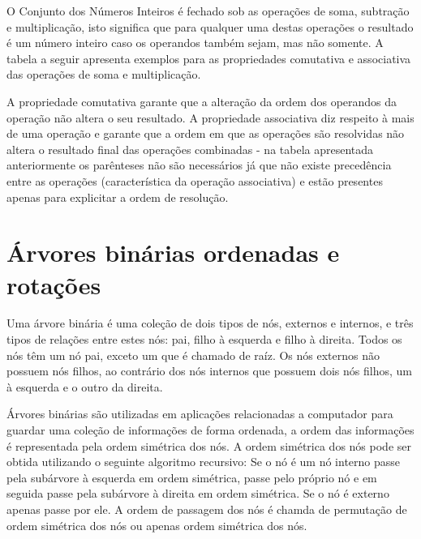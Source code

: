 O Conjunto dos Números Inteiros é fechado sob as operações de soma, subtração e multiplicação, isto significa que para qualquer uma destas operações o resultado é um número inteiro caso os operandos também sejam, mas não somente. A tabela a seguir apresenta exemplos para as propriedades comutativa e associativa das operações de soma e multiplicação.

\begin{table}[htb]
\end{table}

A propriedade comutativa garante que a alteração da ordem dos operandos da operação não altera o seu resultado. A propriedade associativa diz respeito à mais de uma operação e garante que a ordem em que as operações são resolvidas não altera o resultado final das operações combinadas - na tabela apresentada anteriormente os parênteses não são necessários já que não existe precedência entre as operações (característica da operação associativa) e estão presentes apenas para explicitar a ordem de resolução.

\chapter{Árvores binárias ordenadas e rotações}
Uma árvore binária é uma coleção de dois tipos de nós, externos e internos, e três tipos de relações entre estes nós: pai, filho à esquerda e filho à direita. Todos os nós têm um nó pai, exceto um que é chamado de raíz. Os nós externos não possuem nós filhos, ao contrário dos nós internos que possuem dois nós filhos, um à esquerda e o outro da direita.

Árvores binárias são utilizadas em aplicações relacionadas a computador para guardar uma coleção de informações de forma ordenada, a ordem das informações é representada pela ordem simétrica dos nós. A ordem simétrica dos nós pode ser obtida utilizando o seguinte algoritmo recursivo: Se o nó é um nó interno passe pela subárvore à esquerda em ordem simétrica, passe pelo próprio nó e em seguida passe pela subárvore à direita em ordem simétrica. Se o nó é externo apenas passe por ele. A ordem de passagem dos nós é chamda de permutação de ordem simétrica dos nós ou apenas ordem simétrica dos nós. \cite{binTree}



